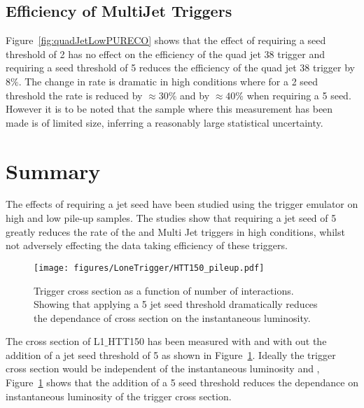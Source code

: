 \subsection{Efficiency of MultiJet Triggers} %
\label{par:Efficiency of MultiJet Triggers}
Figure~\ref{fig:quadJetLowPURECO} shows that the effect of requiring a seed 
threshold of \unit{2}{\GeV} has no effect on the efficiency of the quad jet 
\unit{38}{\GeV} trigger and requiring a seed threshold of \unit{5}{\GeV} 
reduces the efficiency of the quad jet 38 trigger by $8\%$. The change in rate 
is dramatic in high \pu conditions where for a \unit{2}{\GeV} seed 
threshold the rate is reduced by $\approx 30\%$ and by $\approx 40\%$ when 
requiring a \unit{5}{\GeV} seed. However it is to be noted that the sample 
where this measurement has been made is of limited size, inferring a reasonably 
large statistical uncertainty. 



\section{Summary} %
\label{sec:Summary}
The effects of requiring a jet seed have been studied using the \Lone trigger 
emulator on high and low pile-up samples. The studies show that requiring a jet 
seed of \unit{5}{\GeV} greatly reduces the rate of the \HT and Multi Jet triggers in 
high \pu conditions, whilst not adversely effecting the data taking 
efficiency of these triggers.

\begin{figure}[ht]
  \centering
  \texttt{[image: figures/LoneTrigger/HTT150\_pileup.pdf]}
  \caption{Trigger cross section as a function of number of \pu 
  interactions. Showing that applying a \unit{5}{\GeV} jet seed threshold 
  dramatically reduces the dependance of cross section on the instantaneous   
  luminosity\cite{jimichep2012}.}
  \label{fig:figures_HTT150_pileup}
\end{figure}

The cross section of L1$\_$HTT150 has been measured with and with out the 
addition of a jet seed threshold of \unit{5}{\GeV} as shown in  
Figure~\ref{fig:figures_HTT150_pileup}. Ideally the trigger cross section would 
be independent of the instantaneous luminosity and \pu, 
Figure~\ref{fig:figures_HTT150_pileup} shows that the addition of a 
\unit{5}{\GeV} seed threshold reduces the dependance on instantaneous 
luminosity of the trigger cross section.


